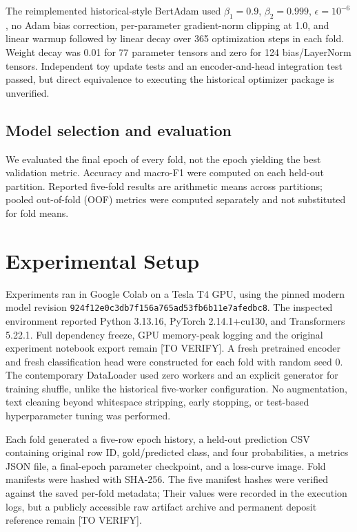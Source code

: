\documentclass[conference]{IEEEtran}
\begin{document}
The reimplemented historical-style BertAdam used $\beta_1=0.9$, $\beta_2=0.999$, $\epsilon=10^{-6}$, no Adam bias correction, per-parameter gradient-norm clipping at 1.0, and linear warmup followed by linear decay over 365 optimization steps in each fold. Weight decay was 0.01 for 77 parameter tensors and zero for 124 bias/LayerNorm tensors. Independent toy update tests and an encoder-and-head integration test passed, but direct equivalence to executing the historical optimizer package is unverified.

\subsection{Model selection and evaluation}
We evaluated the final epoch of every fold, not the epoch yielding the best validation metric. Accuracy and macro-F1 were computed on each held-out partition. Reported five-fold results are arithmetic means across partitions; pooled out-of-fold (OOF) metrics were computed separately and not substituted for fold means.

\section{Experimental Setup}\label{sec:setup}
Experiments ran in Google Colab on a Tesla T4 GPU, using the pinned modern model revision \texttt{924f12e0c3db7f156a765ad53fb6b11e7afedbc8}. The inspected environment reported Python 3.13.16, PyTorch 2.14.1+cu130, and Transformers 5.22.1. Full dependency freeze, GPU memory-peak logging and the original experiment notebook export remain [TO VERIFY]. A fresh pretrained encoder and fresh classification head were constructed for each fold with random seed 0. The contemporary DataLoader used zero workers and an explicit generator for training shuffle, unlike the historical five-worker configuration. No augmentation, text cleaning beyond whitespace stripping, early stopping, or test-based hyperparameter tuning was performed.

Each fold generated a five-row epoch history, a held-out prediction CSV containing original row ID, gold/predicted class, and four probabilities, a metrics JSON file, a final-epoch parameter checkpoint, and a loss-curve image. Fold manifests were hashed with SHA-256. The five manifest hashes were verified against the saved per-fold metadata; Their values were recorded in the execution logs, but a publicly accessible raw artifact archive and permanent deposit reference remain [TO VERIFY].
\end{document}
